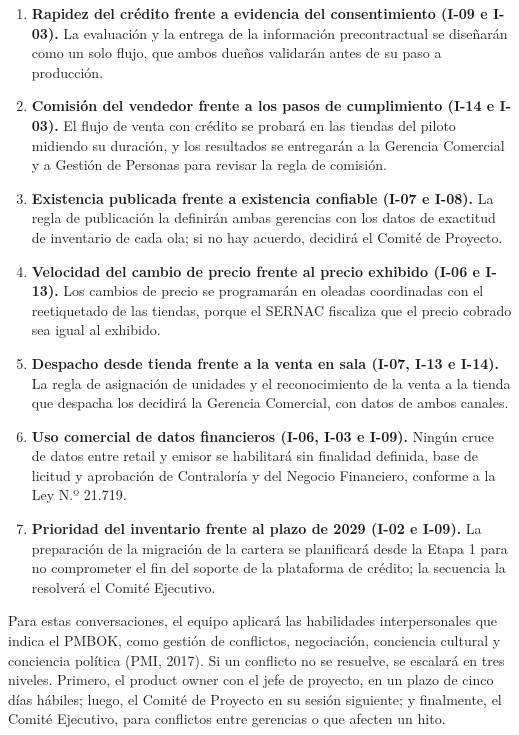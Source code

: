 \documentclass[11pt]{article}
\begin{document}
\begin{enumerate}
\def\labelenumi{\arabic{enumi}.}
\item
  \textbf{Rapidez del crédito frente a evidencia del consentimiento
  (I-09 e I-03).} La evaluación y la entrega de la información
  precontractual se diseñarán como un solo flujo, que ambos dueños
  validarán antes de su paso a producción.
\item
  \textbf{Comisión del vendedor frente a los pasos de cumplimiento (I-14
  e I-03).} El flujo de venta con crédito se probará en las tiendas del
  piloto midiendo su duración, y los resultados se entregarán a la
  Gerencia Comercial y a Gestión de Personas para revisar la regla de
  comisión.
\item
  \textbf{Existencia publicada frente a existencia confiable (I-07 e
  I-08).} La regla de publicación la definirán ambas gerencias con los
  datos de exactitud de inventario de cada ola; si no hay acuerdo,
  decidirá el Comité de Proyecto.
\item
  \textbf{Velocidad del cambio de precio frente al precio exhibido (I-06
  e I-13).} Los cambios de precio se programarán en oleadas coordinadas
  con el reetiquetado de las tiendas, porque el SERNAC fiscaliza que el
  precio cobrado sea igual al exhibido.
\item
  \textbf{Despacho desde tienda frente a la venta en sala (I-07, I-13 e
  I-14).} La regla de asignación de unidades y el reconocimiento de la
  venta a la tienda que despacha los decidirá la Gerencia Comercial, con
  datos de ambos canales.
\item
  \textbf{Uso comercial de datos financieros (I-06, I-03 e I-09).}
  Ningún cruce de datos entre retail y emisor se habilitará sin
  finalidad definida, base de licitud y aprobación de Contraloría y del
  Negocio Financiero, conforme a la Ley N.º 21.719.
\item
  \textbf{Prioridad del inventario frente al plazo de 2029 (I-02 e
  I-09).} La preparación de la migración de la cartera se planificará
  desde la Etapa 1 para no comprometer el fin del soporte de la
  plataforma de crédito; la secuencia la resolverá el Comité Ejecutivo.
\end{enumerate}

Para estas conversaciones, el equipo aplicará las habilidades
interpersonales que indica el PMBOK, como gestión de conflictos,
negociación, conciencia cultural y conciencia política (PMI, 2017). Si
un conflicto no se resuelve, se escalará en tres niveles. Primero, el
product owner con el jefe de proyecto, en un plazo de cinco días
hábiles; luego, el Comité de Proyecto en su sesión siguiente; y
finalmente, el Comité Ejecutivo, para conflictos entre gerencias o que
afecten un hito.
\end{document}
